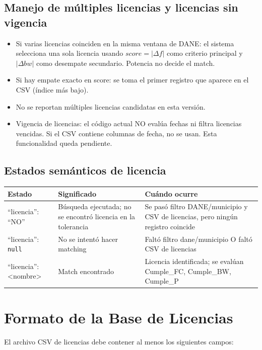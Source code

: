 \subsection{Manejo de múltiples licencias y licencias sin vigencia}

\begin{itemize}
\item Si varias licencias coinciden en la misma ventana de DANE: el sistema selecciona una sola licencia usando $score = |\Delta f|$ como criterio principal y $|\Delta bw|$ como desempate secundario. Potencia no decide el match.
\item Si hay empate exacto en score: se toma el primer registro que aparece en el CSV (índice más bajo).
\item No se reportan múltiples licencias candidatas en esta versión.
\item Vigencia de licencias: el código actual NO evalúa fechas ni filtra licencias vencidas. Si el CSV contiene columnas de fecha, no se usan. Esta funcionalidad queda pendiente.
\end{itemize}

\subsection{Estados semánticos de licencia}

\begin{tabular}{p{4cm}p{5cm}p{5cm}}
\textbf{Estado} & \textbf{Significado} & \textbf{Cuándo ocurre} \\
\hline
\enquote{licencia}: \enquote{NO} & Búsqueda ejecutada; no se encontró licencia en la tolerancia & Se pasó filtro DANE/municipio y CSV de licencias, pero ningún registro coincide \\
\enquote{licencia}: \texttt{null} & No se intentó hacer matching & Faltó filtro dane/municipio O faltó CSV de licencias \\
\enquote{licencia}: \textless nombre\textgreater & Match encontrado & Licencia identificada; se evalúan Cumple\_FC, Cumple\_BW, Cumple\_P \\
\end{tabular}

\section{Formato de la Base de Licencias}

El archivo CSV de licencias debe contener al menos los siguientes campos:


